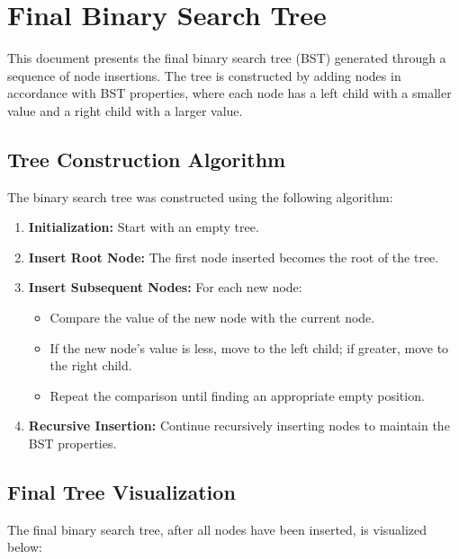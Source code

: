 \documentclass[10pt,a4paper]{article}
\begin{document}
\section*{Final Binary Search Tree}
This document presents the final binary search tree (BST) generated through a sequence of node insertions. The tree is constructed by adding nodes in accordance with BST properties, where each node has a left child with a smaller value and a right child with a larger value.

\subsection*{Tree Construction Algorithm}
The binary search tree was constructed using the following algorithm:
\begin{enumerate}
    \item \textbf{Initialization:} Start with an empty tree.
    \item \textbf{Insert Root Node:} The first node inserted becomes the root of the tree.
    \item \textbf{Insert Subsequent Nodes:} For each new node:
    \begin{itemize}
        \item Compare the value of the new node with the current node.
        \item If the new node's value is less, move to the left child; if greater, move to the right child.
        \item Repeat the comparison until finding an appropriate empty position.
    \end{itemize}
    \item \textbf{Recursive Insertion:} Continue recursively inserting nodes to maintain the BST properties.
\end{enumerate}

\subsection*{Final Tree Visualization}
The final binary search tree, after all nodes have been inserted, is visualized below:

\begin{center}
\end{center}
\end{document}
